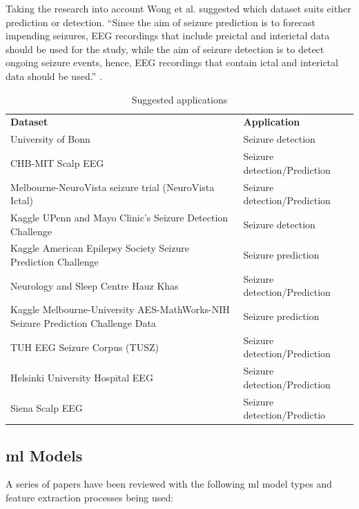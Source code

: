 \documentclass[12pt]{article}
\begin{document}
Taking the research into account Wong et al. suggested which dataset suits either prediction or detection. ``Since the aim of seizure prediction is to forecast impending seizures, EEG recordings that include preictal and interictal data should be used for the study, while the aim of seizure detection is to detect ongoing seizure events, hence, EEG recordings that contain ictal and interictal data should be used.'' \cite{wong2023eeg}.

\begin{table}[H]
\centering
\begin{tabular}{p{}p{}}
\textbf{Dataset}                     & \textbf{Application}         \\
University of Bonn                   & Seizure detection            \\
CHB-MIT Scalp EEG                    & Seizure detection/Prediction \\
Melbourne-NeuroVista seizure trial (NeuroVista Ictal)                           & Seizure detection/Prediction \\
Kaggle UPenn and Mayo Clinic's Seizure Detection Challenge                      & Seizure detection            \\
Kaggle American Epilepsy Society Seizure Prediction Challenge                   & Seizure prediction           \\
Neurology and Sleep Centre Hauz Khas & Seizure detection/Prediction \\
Kaggle Melbourne-University AES-MathWorks-NIH Seizure Prediction Challenge Data & Seizure prediction           \\
TUH EEG Seizure Corpus (TUSZ)        & Seizure detection/Prediction \\
Helsinki University Hospital EEG     & Seizure detection/Prediction \\
Siena Scalp EEG                      & Seizure detection/Predictio 
\end{tabular}
\caption{Suggested applications}
\label{dataset_applications}
\end{table} 

\subsection{\acrfull{ml} Models}\label{models}

A series of papers have been reviewed with the following \acrshort{ml} model types and feature extraction processes being used:
\end{document}
